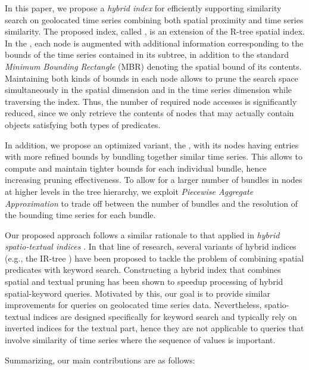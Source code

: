 In this paper, we propose a {\em hybrid index} for efficiently supporting similarity search on geolocated time series combining both spatial proximity and time series similarity. The proposed index, called \textit{\tsr}, is an extension of the R-tree spatial index. In the \tsr, each node is augmented with additional information corresponding to the bounds of the time series contained in its subtree, in addition to the standard \emph{Minimum Bounding Rectangle} (MBR) denoting the spatial bound of its contents. Maintaining both kinds of bounds in each node allows to prune the search space simultaneously in the spatial dimension and in the time series dimension while traversing the index. Thus, the number of required node accesses is significantly reduced, since we only retrieve the contents of nodes that may actually contain objects satisfying both types of predicates.

In addition, we propose an optimized variant, the \textit{\ctsr}, with its nodes having entries with more refined bounds by bundling together similar time series. This allows to compute and maintain tighter bounds for each individual bundle, hence increasing pruning effectiveness. To allow for a larger number of bundles in nodes at higher levels in the tree hierarchy, we exploit \emph{Piecewise Aggregate Approximation} \cite{keogh2001paa,faloutsos2000vldb} to trade off between the number of bundles and the resolution of the bounding time series for each bundle.

Our proposed approach follows a similar rationale to that applied in {\em hybrid spatio-textual indices} \cite{chen2013vldb}. In that line of research, several variants of hybrid indices (e.g., the IR-tree \cite{cong2009vldb}) have been proposed to tackle the problem of combining spatial predicates with keyword search. Constructing a hybrid index that combines spatial and textual pruning has been shown to speedup processing of hybrid spatial-keyword queries. Motivated by this, our goal is to provide similar improvements for queries on geolocated time series data. Nevertheless, spatio-textual indices are designed specifically for keyword search and typically rely on inverted indices for the textual part, hence they are not applicable to queries that involve similarity of time series where the sequence of values is important.

Summarizing, our main contributions are as follows:

